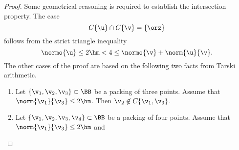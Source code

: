 \begin{proof}
 Some geometrical reasoning is required to
establish the intersection property.  The case
\[ 
C\{\u\}\cap C\{\v\} = \{\orz\}
\] 
follows from the strict triangle inequality 
\[ 
\normo{\u} \le 2\hm < 4 \le \normo{\v} + \norm{\u}{\v}.
\] 
The other cases of the proof are based on the following two facts from
Tarski arithmetic.  
\begin{enumerate}
\item {} Let $\{\v_1,\v_2,\v_3\}\subset \BB$ be a
  packing of three points.  Assume that $\norm{\v_1}{\v_3}\le 2\hm$.
  Then $\v_2\not\in C\{\v_1,\v_3\}$.
\item {} Let $\{\v_1,\v_2,\v_3,\v_4\}\subset \BB$ be a
  packing of four points.  Assume that $\norm{\v_1}{\v_3}\le 2\hm$ and

\end{enumerate}
\end{proof}
